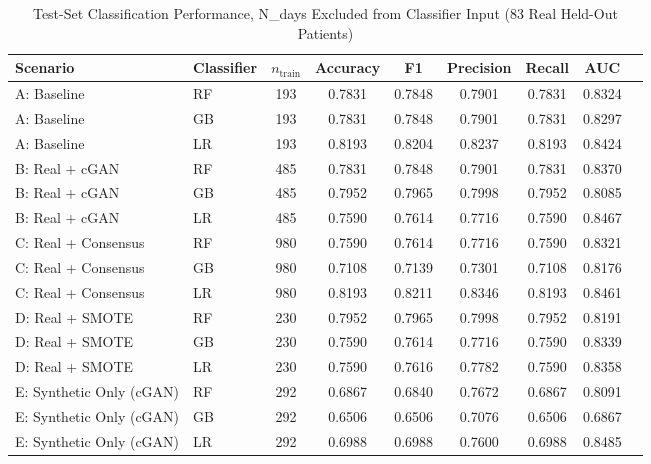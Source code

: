 \begin{table}[t]
\revisioncolor
  \centering
  \caption{\revisioncolor Test-Set Classification Performance, N\_days Excluded from Classifier Input (83 Real Held-Out Patients)}
  \label{tab:performance}
  \begin{tabular}{llccccccc}
    \toprule
    Scenario & Classifier & $n_{\text{train}}$ & Accuracy & F1 & Precision & Recall & AUC \\
    \midrule
    A: Baseline       & RF      & 193 & 0.7831 & 0.7848 & 0.7901 & 0.7831 & 0.8324 \\
    A: Baseline       & GB  & 193 & 0.7831 & 0.7848 & 0.7901 & 0.7831 & 0.8297 \\
    A: Baseline       & LR & 193 & 0.8193 & 0.8204 & 0.8237 & 0.8193 & 0.8424 \\
    \midrule
    B: Real + cGAN   & RF      & 485 & 0.7831 & 0.7848 & 0.7901 & 0.7831 & 0.8370 \\
    B: Real + cGAN   & GB  & 485 & 0.7952 & 0.7965 & 0.7998 & 0.7952 & 0.8085 \\
    B: Real + cGAN   & LR & 485 & 0.7590 & 0.7614 & 0.7716 & 0.7590 & 0.8467 \\
    \midrule
    C: Real + Consensus & RF    & 980 & 0.7590 & 0.7614 & 0.7716 & 0.7590 & 0.8321 \\
    C: Real + Consensus & GB& 980 & 0.7108 & 0.7139 & 0.7301 & 0.7108 & 0.8176 \\
    C: Real + Consensus & LR & 980 & 0.8193 & 0.8211 & 0.8346 & 0.8193 & 0.8461 \\
    \midrule
    D: Real + SMOTE   & RF      & 230 & 0.7952 & 0.7965 & 0.7998 & 0.7952 & 0.8191 \\
    D: Real + SMOTE   & GB  & 230 & 0.7590 & 0.7614 & 0.7716 & 0.7590 & 0.8339 \\
    D: Real + SMOTE   & LR & 230 & 0.7590 & 0.7616 & 0.7782 & 0.7590 & 0.8358 \\
    \midrule
    E: Synthetic Only (cGAN) & RF      & 292 & 0.6867 & 0.6840 & 0.7672 & 0.6867 & 0.8091 \\
    E: Synthetic Only (cGAN) & GB  & 292 & 0.6506 & 0.6506 & 0.7076 & 0.6506 & 0.6867 \\
    E: Synthetic Only (cGAN) & LR & 292 & 0.6988 & 0.6988 & 0.7600 & 0.6988 & 0.8485 \\
    \bottomrule
  \end{tabular}
\end{table}


